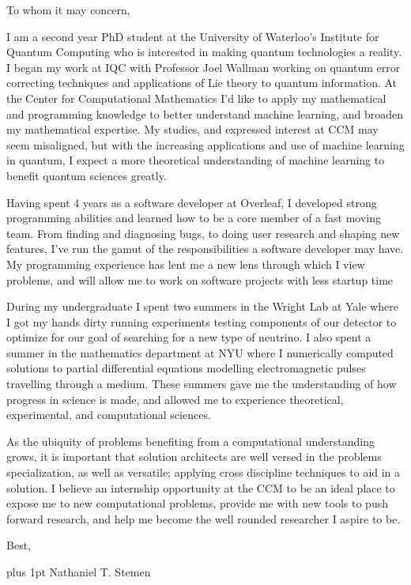 \documentclass[12pt]{article}
\begin{document}
\noindent
To whom it may concern,

I am a second year PhD student at the University of Waterloo's Institute for Quantum Computing who is interested in making quantum technologies a reality.
I began my work at IQC with Professor Joel Wallman working on quantum error correcting techniques and applications of Lie theory to quantum information.
At the Center for Computational Mathematics I'd like to apply my mathematical and programming knowledge to better understand machine learning, and broaden my mathematical expertise.
My studies, and expressed interest at CCM may seem misaligned, but with the increasing applications and use of machine learning in quantum, I expect a more theoretical understanding of machine learning to benefit quantum sciences greatly.

Having spent 4 years as a software developer at Overleaf, I developed strong programming abilities and learned how to be a core member of a fast moving team.
From finding and diagnosing bugs, to doing user research and shaping new features, I've run the gamut of the responsibilities a software developer may have.
My programming experience has lent me a new lens through which I view problems, and will allow me to work on software projects with less startup time

During my undergraduate I spent two summers in the Wright Lab at Yale where I got my hands dirty running experiments testing components of our detector to optimize for our goal of searching for a new type of neutrino.
I also spent a summer in the mathematics department at NYU where I numerically computed solutions to partial differential equations modelling electromagnetic pulses travelling through a medium.
These summers gave me the understanding of how progress in science is made, and allowed me to experience theoretical, experimental, and computational sciences.

As the ubiquity of problems benefiting from a computational understanding grows, it is important that solution architects are well versed in the problems specialization, as well as versatile; applying cross discipline techniques to aid in a solution.
I believe an internship opportunity at the CCM to be an ideal place to expose me to new computational problems, provide me with new tools to push forward research, and help me become the well rounded researcher I aspire to be.

\noindent
Best,

\parskip=0pt plus 1pt
Nathaniel T. Stemen
\end{document}
